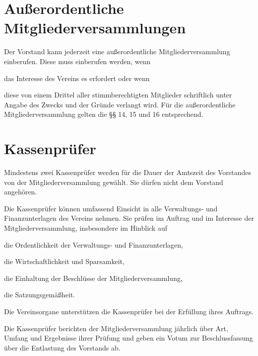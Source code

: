 \section{Außerordentliche Mitgliederversammlungen}
\begin{para}
	\item Der Vorstand kann jederzeit eine außerordentliche Mitgliederversammlung einberufen. Diese muss einberufen werden, wenn
	\begin{subpara}
		\item das Interesse des Vereins es erfordert oder wenn
		\item diese von einem Drittel aller stimmberechtigten Mitglieder schriftlich unter Angabe des Zwecks und der Gründe verlangt wird.
		Für die außerordentliche Mitgliederversammlung gelten die §§ 14, 15 und 16 entsprechend.
	\end{subpara}
\end{para}

\section{Kassenprüfer}
\begin{para}
	\item Mindestens zwei Kassenprüfer werden für die Dauer der Amtszeit des Vorstandes von der Mitgliederversammlung gewählt. Sie dürfen nicht dem Vorstand angehören.
	\item Die Kassenprüfer können umfassend Einsicht in alle Verwaltungs- und Finanzunterlagen des Vereins nehmen. Sie prüfen im Auftrag und im Interesse der Mitgliederversammlung, insbesondere im Hinblick auf
	\begin{subpara}
		\item die Ordentlichkeit der Verwaltungs- und Finanzunterlagen,
		\item die Wirtschaftlichkeit und Sparsamkeit,
		\item die Einhaltung der Beschlüsse der Mitgliederversammlung,
		\item die Satzungsgemäßheit.
	\end{subpara}
	\item Die Vereinsorgane unterstützen die Kassenprüfer bei der Erfüllung ihres Auftrags.
	\item Die Kassenprüfer berichten der Mitgliederversammlung jährlich über Art, Umfang und Ergebnisse ihrer Prüfung und geben ein Votum zur Beschlussfassung über die Entlastung des Vorstands ab.
\end{para}

